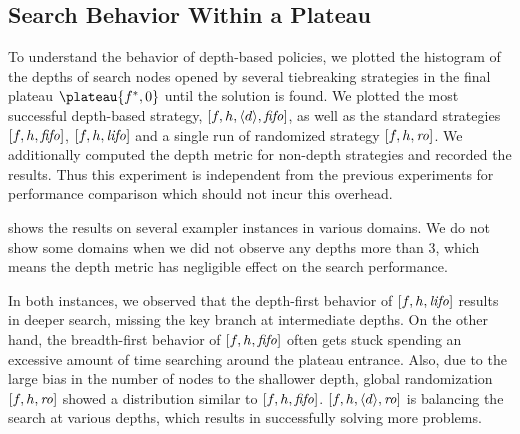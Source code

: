 \subsection{Search Behavior Within a Plateau}

To understand the behavior of depth-based policies, we plotted the
histogram of the depths of search nodes opened by several tiebreaking
strategies in the final plateau $\plateau{f^*,0}$ until the solution is
found.  We plotted the most successful depth-based strategy,
$[f,h,{\left<d\right>},{\mbox{\textit{fifo}}}]$, as well as the standard strategies $[f,h,{\mbox{\textit{fifo}}}]$,
$[f,h,{\mbox{\textit{lifo}}}]$ and a single run of randomized strategy $[f,h,{\mbox{\textit{ro}}}]$.
We additionally computed the depth metric for non-depth strategies and
recorded the results. Thus this experiment is independent from the
previous experiments for performance comparison which should not incur
this overhead.


 shows the results on several exampler
instances in various domains. We do not show some domains when we did
not observe any depths more than 3, which means the depth metric has
negligible effect on the search performance.

In both instances, we observed that the depth-first behavior of
$[f,h,{\mbox{\textit{lifo}}}]$ results in deeper search, missing the key branch at
intermediate depths.  On the other hand, the breadth-first behavior of
$[f,h,{\mbox{\textit{fifo}}}]$ often gets stuck spending an excessive amount of time
searching around the plateau entrance.  Also, due to the large bias in
the number of nodes to the shallower depth, global randomization
$[f,h,{\mbox{\textit{ro}}}]$ showed a distribution similar to $[f,h,{\mbox{\textit{fifo}}}]$.
$[f,h,{\left<d\right>},{\mbox{\textit{ro}}}]$ is balancing the search at various depths, which
results in successfully solving more problems.



